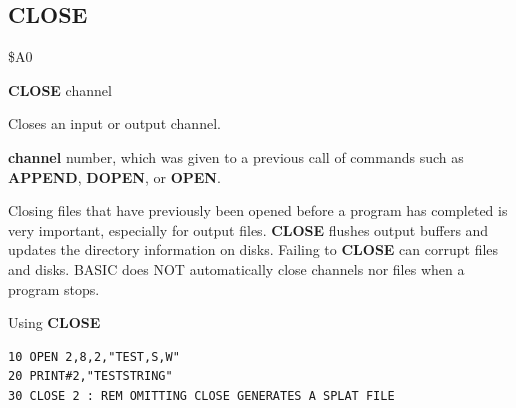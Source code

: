 \subsection{CLOSE}
\begin{description}[leftmargin=2cm,style=nextline]
\item [Token:] \$A0
\item [Format:] {\bf CLOSE} channel
\item [Usage:] Closes an input or output channel.

               {\bf channel} number, which was given to a previous
               call of commands such as {\bf APPEND}, {\bf DOPEN}, or {\bf OPEN}.

\item [Remarks:] Closing files that have previously been opened
               before a program has completed is
               very important, especially for output files.
               {\bf CLOSE} flushes output buffers and
               updates the directory information on disks.
               Failing to {\bf CLOSE} can corrupt files and disks.
               BASIC does NOT automatically close channels nor files
               when a program stops.

\item [Example:] Using {\bf CLOSE}
\begin{tcolorbox}[colback=black,coltext=white]
\verbatimfont{\codefont}
\begin{verbatim}
10 OPEN 2,8,2,"TEST,S,W"
20 PRINT#2,"TESTSTRING"
30 CLOSE 2 : REM OMITTING CLOSE GENERATES A SPLAT FILE
\end{verbatim}
\end{tcolorbox}
\end{description}


\newpage
